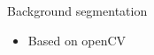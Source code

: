
\begin{frame}{Background segmentation}
	\begin{itemize}
	\item Based on openCV
	\end{itemize}
\end{frame}
